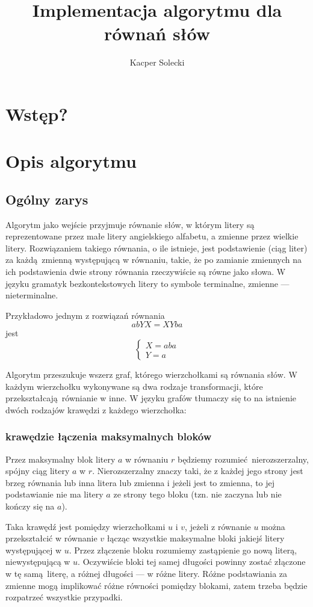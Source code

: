 \documentclass[leqno, 12pt]{article}
\title{Implementacja algorytmu dla równań słów}
\author{Kacper Solecki}
\date{}
\begin{document}
\maketitle

\section{Wstęp?}
\section{Opis algorytmu}

\subsection{Ogólny zarys}
Algorytm jako wejście przyjmuje równanie słów, w którym litery są reprezentowane przez małe litery angielskiego alfabetu, a zmienne przez wielkie litery. Rozwiązaniem takiego równania, o ile istnieje,
jest podstawienie (ciąg liter) za każdą zmienną występującą w równaniu, takie, że po zamianie zmiennych na ich podstawienia dwie strony równania rzeczywiście są równe jako słowa. W języku gramatyk bezkontekstowych litery to symbole terminalne, zmienne --- nieterminalne. 


Przykładowo jednym z rozwiązań równania $$abYX = XYba$$ jest
$$
\begin{cases}
X = aba \\
Y = a
\end{cases}
$$

Algorytm przeszukuje wszerz graf, którego wierzchołkami są równania słów. 
W każdym wierzchołku wykonywane są dwa rodzaje transformacji, które przekształcają równianie w inne. W języku grafów tłumaczy się to na istnienie dwóch rodzajów krawędzi z każdego wierzchołka:

\subsubsection*{krawędzie łączenia maksymalnych bloków}
Przez maksymalny blok litery $a$ w równaniu $r$ będziemy rozumieć nierozszerzalny, spójny ciąg litery $a$ w $r$. Nierozszerzalny znaczy taki, że z każdej jego strony jest brzeg równania lub inna litera lub zmienna i jeżeli jest to zmienna, to jej podstawianie nie ma litery $a$ ze strony tego bloku (tzn. nie zaczyna lub nie kończy się na $a$).

Taka krawędź jest pomiędzy wierzchołkami $u$ i $v$, jeżeli z równanie $u$ można przekształcić w równanie $v$ łącząc wszystkie maksymalne bloki jakiejś litery występującej w $u$. Przez złączenie bloku rozumiemy zastąpienie go nową literą, niewystępującą w $u$. Oczywiście bloki tej samej długości powinny zostać złączone w tę samą literę, a różnej długości --- w różne litery.
Różne podstawiania za zmienne mogą implikować różne równości pomiędzy blokami, zatem trzeba będzie rozpatrzeć wszystkie przypadki.
\end{document}
